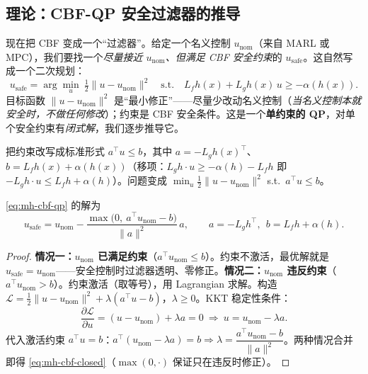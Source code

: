 \subsection{理论：CBF-QP 安全过滤器的推导}
\label{sec:mh-cbf-qp}

现在把 CBF 变成一个“过滤器”。给定一个名义控制 $u_{\text{nom}}$（来自 MARL 或 MPC），我们要找一个\emph{尽量接近 $u_{\text{nom}}$、但满足 CBF 安全约束}的 $u_{\text{safe}}$。这自然写成一个二次规划：
\begin{equation}
  u_{\text{safe}}=\arg\min_{u}\ \tfrac12\|u-u_{\text{nom}}\|^2\quad\text{s.t.}\quad L_fh(x)+L_gh(x)\,u\ge-\alpha(h(x)).
  \label{eq:mh-cbf-qp}
\end{equation}
目标函数 $\|u-u_{\text{nom}}\|^2$ 是“最小修正”——尽量少改动名义控制（\emph{当名义控制本就安全时，不做任何修改}）；约束是 CBF 安全条件。这是一个\textbf{单约束的 QP}，对单个安全约束有\emph{闭式解}，我们逐步推导它。

把约束改写成标准形式 $a^\top u\le b$，其中 $a=-L_gh(x)^\top$、$b=L_fh(x)+\alpha(h(x))$（移项：$L_gh\cdot u\ge-\alpha(h)-L_fh$ 即 $-L_gh\cdot u\le L_fh+\alpha(h)$）。问题变成 $\min_u\tfrac12\|u-u_{\text{nom}}\|^2$ s.t.\ $a^\top u\le b$。

\begin{theorem}\label{thm:mh-cbf-closed}
\cref{eq:mh-cbf-qp} 的解为
\begin{equation}
  u_{\text{safe}}=u_{\text{nom}}-\frac{\max\!\big(0,\ a^\top u_{\text{nom}}-b\big)}{\|a\|^2}\,a,\qquad a=-L_gh^\top,\ \ b=L_fh+\alpha(h).
  \label{eq:mh-cbf-closed}
\end{equation}
\end{theorem}
\begin{proof}
\textbf{情况一：$u_{\text{nom}}$ 已满足约束}（$a^\top u_{\text{nom}}\le b$）。约束不激活，最优解就是 $u_{\text{safe}}=u_{\text{nom}}$——安全控制时过滤器透明、零修正。\textbf{情况二：$u_{\text{nom}}$ 违反约束}（$a^\top u_{\text{nom}}>b$）。约束激活（取等号），用 Lagrangian 求解。构造 $\mathcal{L}=\tfrac12\|u-u_{\text{nom}}\|^2+\lambda(a^\top u-b)$，$\lambda\ge0$。KKT 稳定性条件：
\begin{equation}
  \frac{\partial\mathcal{L}}{\partial u}=(u-u_{\text{nom}})+\lambda a=0\ \Rightarrow\ u=u_{\text{nom}}-\lambda a.
  \label{eq:mh-kkt-stat}
\end{equation}
代入激活约束 $a^\top u=b$：$a^\top(u_{\text{nom}}-\lambda a)=b\Rightarrow\lambda=\dfrac{a^\top u_{\text{nom}}-b}{\|a\|^2}$。两种情况合并即得 \cref{eq:mh-cbf-closed}（$\max(0,\cdot)$ 保证只在违反时修正）。
\end{proof}

